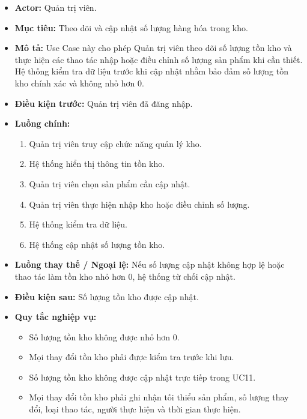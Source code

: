 \documentclass[12pt,a4paper]{article}
\begin{document}
\begin{itemize}

 \item \textbf{Actor:} Quản trị viên.

 \item \textbf{Mục tiêu:} Theo dõi và cập nhật số lượng hàng hóa trong kho.

 \item \textbf{Mô tả:} Use Case này cho phép Quản trị viên theo dõi số lượng tồn kho và thực hiện các thao tác nhập hoặc điều chỉnh số lượng sản phẩm khi cần thiết. Hệ thống kiểm tra dữ liệu trước khi cập nhật nhằm bảo đảm số lượng tồn kho chính xác và không nhỏ hơn 0.

 \item \textbf{Điều kiện trước:} Quản trị viên đã đăng nhập.

 \item \textbf{Luồng chính:}

 \begin{enumerate}

  \item Quản trị viên truy cập chức năng quản lý kho.

  \item Hệ thống hiển thị thông tin tồn kho.

  \item Quản trị viên chọn sản phẩm cần cập nhật.

  \item Quản trị viên thực hiện nhập kho hoặc điều chỉnh số lượng.

  \item Hệ thống kiểm tra dữ liệu.

  \item Hệ thống cập nhật số lượng tồn kho.

 \end{enumerate}

 \item \textbf{Luồng thay thế / Ngoại lệ:} Nếu số lượng cập nhật không hợp lệ hoặc thao tác làm tồn kho nhỏ hơn 0, hệ thống từ chối cập nhật.

 \item \textbf{Điều kiện sau:} Số lượng tồn kho được cập nhật.

 \item \textbf{Quy tắc nghiệp vụ:}

 \begin{itemize}

  \item Số lượng tồn kho không được nhỏ hơn 0.

  \item Mọi thay đổi tồn kho phải được kiểm tra trước khi lưu.

  \item Số lượng tồn kho không được cập nhật trực tiếp trong UC11.

  \item Mọi thay đổi tồn kho phải ghi nhận tối thiểu sản phẩm, số lượng thay đổi, loại thao tác, người thực hiện và thời gian thực hiện.

 \end{itemize}

\end{itemize}
\end{document}
